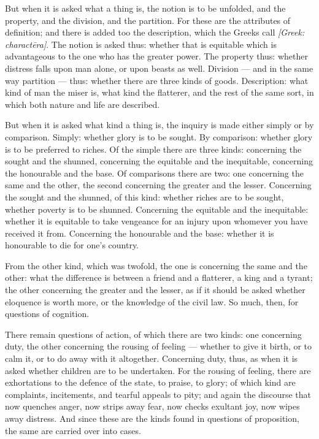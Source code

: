  But when it is asked what a thing is, the notion is to be unfolded, and the property, and the division, and the partition. For these are the attributes of definition; and there is added too the description, which the Greeks call \textit{[Greek: charactēra]}. The notion is asked thus: whether that is equitable which is advantageous to the one who has the greater power. The property thus: whether distress falls upon man alone, or upon beasts as well. Division — and in the same way partition — thus: whether there are three kinds of goods. Description: what kind of man the miser is, what kind the flatterer, and the rest of the same sort, in which both nature and life are described.

 But when it is asked what kind a thing is, the inquiry is made either simply or by comparison. Simply: whether glory is to be sought. By comparison: whether glory is to be preferred to riches. Of the simple there are three kinds: concerning the sought and the shunned, concerning the equitable and the inequitable, concerning the honourable and the base. Of comparisons there are two: one concerning the same and the other, the second concerning the greater and the lesser. Concerning the sought and the shunned, of this kind: whether riches are to be sought, whether poverty is to be shunned. Concerning the equitable and the inequitable: whether it is equitable to take vengeance for an injury upon whomever you have received it from. Concerning the honourable and the base: whether it is honourable to die for one's country.

 From the other kind, which was twofold, the one is concerning the same and the other: what the difference is between a friend and a flatterer, a king and a tyrant; the other concerning the greater and the lesser, as if it should be asked whether eloquence is worth more, or the knowledge of the civil law. So much, then, for questions of cognition.

 There remain questions of action, of which there are two kinds: one concerning duty, the other concerning the rousing of feeling — whether to give it birth, or to calm it, or to do away with it altogether. Concerning duty, thus, as when it is asked whether children are to be undertaken. For the rousing of feeling, there are exhortations to the defence of the state, to praise, to glory; of which kind are complaints, incitements, and tearful appeals to pity; and again the discourse that now quenches anger, now strips away fear, now checks exultant joy, now wipes away distress. And since these are the kinds found in questions of proposition, the same are carried over into cases.

